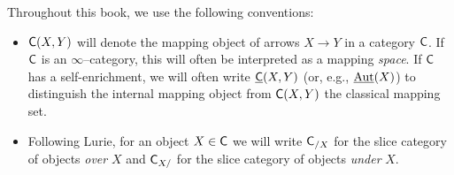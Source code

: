 
Throughout this book, we use the following conventions:

\begin{itemize}
\item $\mathsf{C}(X, Y)$ will denote the mapping object of arrows $X \to Y$ in a category $\mathsf{C}$.  If $\mathsf{C}$ is an $\infty$--category, this will often be interpreted as a mapping \emph{space}.  If $\mathsf{C}$ has a self-enrichment, we will often write $\underline{\mathsf{C}}(X, Y)$ (or, e.g., $\operatorname{\underline{\smash{\operatorname{Aut}}}}(X)$) to distinguish the internal mapping object from $\mathsf{C}(X, Y)$ the classical mapping set.
\item Following Lurie, for an object $X \in \mathsf{C}$ we will write $\mathsf{C}_{/X}$ for the slice category of objects \emph{over} $X$ and $\mathsf{C}_{X/}$ for the slice category of objects \emph{under} $X$.
\end{itemize}
